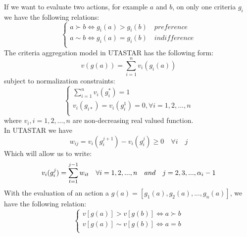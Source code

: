 \documentclass{report}
\begin{document}
If we want to evaluate two actions, for example $a$ and $b$, on only one criteria $g_i$ we have the following relations: 
\begin{equation}
\begin{cases}
a \succ b\Leftrightarrow g_i(a) > g_i(b) \quad preference\\
a\sim b \Leftrightarrow g_i(a) = g_i(b) \quad indifference \\
\end{cases}
\end{equation}
The criteria aggregation model in UTASTAR has the following form:
\begin{equation}\label{eq1}
v(g(a)) = \sum_{i=1}^{n} v_i (g_i (a))
\end{equation}
subject to normalization constraints:\\
\begin{equation}\label{eq2}
\begin{cases}
\sum_{i=1}^{n} v_i(g_{i}^{*}) = 1\\
v_i(g_{i*})= v_i(g_i^1) = 0, \forall i = 1, 2, ..., n\\
\end{cases}
\end{equation}
where $ v_i, i = 1,2,...,n$ are non-decreasing real valued function.\\
In UTASTAR we have 
\begin{equation}
w_{ij} = v_i(g_i^{j+1}) - v_i(g_i^{j}) \geq 0 \quad \forall i \quad j 
\end{equation}
Which will allow us to write: 
\begin{equation}
v_i(g_i^j) = \sum_{t=1}^{j-1} w_{it} \quad \forall i = 1,2,...,n \quad and \quad j = 2,3,...,\alpha _i -1 \\
\end{equation}
With the evaluation of an action a $g(a) = [g_1(a) , g_2(a) , ... , g_n(a)] $, we have the following relation:
\begin{equation}
\begin{cases}
v[g(a)] > v[g(b)] \Leftrightarrow a \succ b\\
v[g(a)] \sim v[g(b)] \Leftrightarrow a = b\\
\end{cases}
\end{equation}

\newpage
\end{document}
